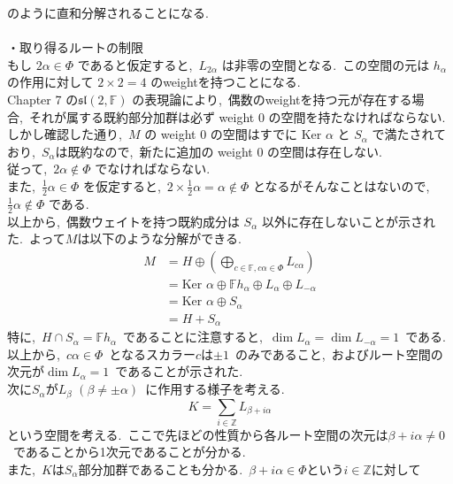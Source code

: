 \documentclass[uplatex,dvipdfmx]{jsarticle}
\begin{document}
のように直和分解されることになる.\\\\
・取り得るルートの制限\\
もし $2\alpha \in \Phi$ であると仮定すると,~$L_{2\alpha}$ は非零の空間となる.~この空間の元は $h_\alpha$ の作用に対して $2 \times 2 = 4$ のweightを持つことになる.\\
Chapter 7 の$\mathfrak{sl}(2,\mathbb{F})$ の表現論により,~偶数のweightを持つ元が存在する場合,~それが属する既約部分加群は必ず weight 0 の空間を持たなければならない.~
しかし確認した通り,~$M$ の weight 0 の空間はすでに $\text{Ker } \alpha$ と $S_\alpha$ で満たされており,~$S_\alpha$は既約なので,~新たに追加の weight 0 の空間は存在しない.\\
従って,~$2\alpha \notin \Phi$ でなければならない.\\
また,~$\frac{1}{2}\alpha \in \Phi$ を仮定すると,~$2 \times \frac{1}{2}\alpha = \alpha \notin \Phi$ となるがそんなことはないので,~$\frac{1}{2}\alpha \notin \Phi$ である.\\
以上から,~偶数ウェイトを持つ既約成分は $S_\alpha$ 以外に存在しないことが示された.~よって$M$は以下のような分解ができる.
\begin{equation*}
    \begin{split}
        M &= H \oplus \left( \bigoplus_{c \in \mathbb{F}, c\alpha \in \Phi} L_{c\alpha} \right)\\
        &= \text{Ker } \alpha \oplus \mathbb{F} h_\alpha \oplus L_\alpha \oplus L_{-\alpha}\\
        &= \text{Ker } \alpha \oplus S_\alpha\\
        &= H + S_\alpha
    \end{split}
\end{equation*}
特に,~$H \cap S_\alpha = \mathbb{F} h_\alpha$~であることに注意すると,~$\dim L_\alpha = \dim L_{-\alpha} = 1$~である.\\
以上から,~$c\alpha \in \Phi$~となるスカラー$c$は$\pm 1$~のみであること,~およびルート空間の次元が$\dim L_\alpha = 1$~であることが示された.\\
次に$S_\alpha$が$L_\beta$ $(\beta \neq \pm \alpha)$~に作用する様子を考える.\\
\begin{equation*}
    K = \sum_{i \in \mathbb{Z}} L_{\beta + i\alpha}
\end{equation*}
という空間を考える.~ここで先ほどの性質から各ルート空間の次元は$\beta + i\alpha \neq 0$~であることから1次元であることが分かる.\\
また,~$K$は$S_\alpha$部分加群であることも分かる.~$\beta +i\alpha \in \Phi$という$i \in \mathbb{Z}$に対して
\end{document}
